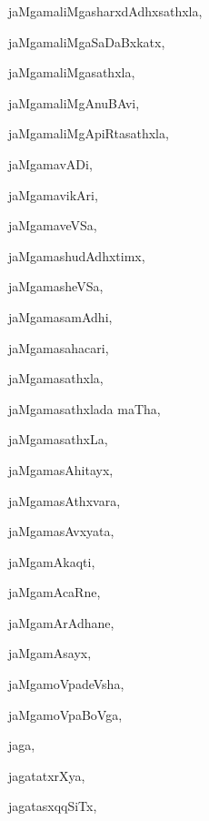\begin{multicols}{3}
{\noindent
{jaMgamaliMgasharxdAdhxsathxla}, \pageref{jaMgamaliMgasharxdAdhxsathxla}

\noindent
{jaMgamaliMgaSaDaBxkatx}, \pageref{jaMgamaliMgaSaDaBxkatx}

\noindent
{jaMgamaliMgasathxla}, \pageref{jaMgamaliMgasathxla}

\noindent
{jaMgamaliMgAnuBAvi}, \pageref{jaMgamaliMgAnuBAvi}

\noindent
{jaMgamaliMgApiRtasathxla}, \pageref{jaMgamaliMgApiRtasathxla}

\noindent
{jaMgamavADi}, \pageref{jaMgamavADi}

\noindent
{jaMgamavikAri}, \pageref{jaMgamavikAri}

\noindent
{jaMgamaveVSa}, \pageref{jaMgamaveVSa}

\noindent
{jaMgamashudAdhxtimx}, \pageref{jaMgamashudAdhxtimx}

\noindent
{jaMgamasheVSa}, \pageref{jaMgamasheVSa}

\noindent
{jaMgamasamAdhi}, \pageref{jaMgamasamAdhi}

\noindent
{jaMgamasahacari}, \pageref{jaMgamasahacari}

\noindent
{jaMgamasathxla}, \pageref{jaMgamasathxla}

\noindent
{jaMgamasathxlada maTha}, \pageref{jaMgamasathxlada maTha}

\noindent
{jaMgamasathxLa}, \pageref{jaMgamasathxLa}

\noindent
{jaMgamasAhitayx}, \pageref{jaMgamasAhitayx}

\noindent
{jaMgamasAthxvara}, \pageref{jaMgamasAthxvara}

\noindent
{jaMgamasAvxyata}, \pageref{jaMgamasAvxyata}

\noindent
{jaMgamAkaqti}, \pageref{jaMgamAkaqti}

\noindent
{jaMgamAcaRne}, \pageref{jaMgamAcaRne}

\noindent
{jaMgamArAdhane}, \pageref{jaMgamArAdhane}

\noindent
{jaMgamAsayx}, \pageref{jaMgamAsayx}

\noindent
{jaMgamoVpadeVsha}, \pageref{jaMgamoVpadeVsha}

\noindent
{jaMgamoVpaBoVga}, \pageref{jaMgamoVpaBoVga}

\noindent
{jaga}, \pageref{jaga}

\noindent
{jagatatxrXya}, \pageref{jagatatxrXya}

\noindent
{jagatasxqqSiTx}, \pageref{jagatasxqqSiTx}

}
\end{multicols}
